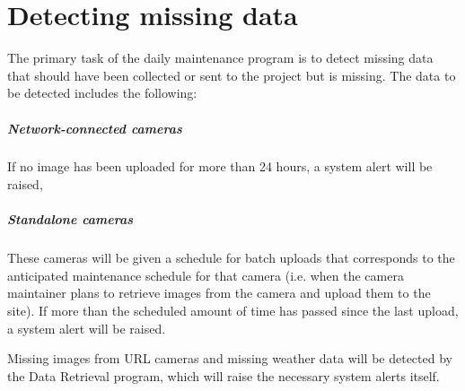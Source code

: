 \documentclass[11pt]{article}
\begin{document}
\section{Detecting missing data}
The primary task of the daily maintenance program is to detect missing data that should have been collected or sent to the project but is missing. The data to be detected includes the following:

\subparagraph{Network-connected cameras} If no image has been uploaded for more than 24 hours, a system alert will be raised,

\subparagraph{Standalone cameras} These cameras will be given a schedule for batch uploads that corresponds to the anticipated maintenance schedule for that camera (i.e. when the camera maintainer plans to retrieve images from the camera and upload them to the site). If more than the scheduled amount of time has passed since the last upload, a system alert will be raised.

Missing images from URL cameras and missing weather data will be detected by the Data Retrieval program, which will raise the necessary system alerts itself.
\end{document}
